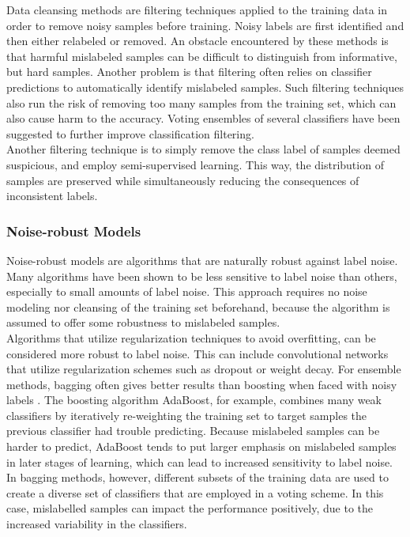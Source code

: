 Data cleansing methods are filtering techniques applied to the training data in order to remove noisy samples before training. Noisy labels are first identified and then either relabeled or removed. An obstacle encountered by these methods is that harmful mislabeled samples can be difficult to distinguish from informative, but hard samples. Another problem is that filtering often relies on classifier predictions to automatically identify mislabeled samples. Such filtering techniques also run the risk of removing too many samples from the training set, which can also cause harm to the accuracy. Voting ensembles of several classifiers have been suggested to further improve classification filtering.\\ 

Another filtering technique is to simply remove the class label of samples deemed suspicious, and employ semi-supervised learning. This way, the distribution of samples are preserved while simultaneously reducing the consequences of inconsistent labels.\\


\subsubsection{Noise-robust Models}
Noise-robust models are algorithms that are naturally robust against label noise. Many algorithms have been shown to be less sensitive to label noise than others, especially to small amounts of label noise. This approach requires no noise modeling nor cleansing of the training set beforehand, because the algorithm is assumed to offer some robustness to mislabeled samples.\\

 Algorithms that utilize regularization techniques to avoid overfitting, can be considered more robust to label noise. This can include convolutional networks that utilize regularization schemes such as dropout or weight decay. For ensemble methods, bagging often gives better results than boosting when faced with noisy labels \citep{Dietterich_boosting_bagging}. The boosting algorithm AdaBoost, for example, combines many weak classifiers by iteratively re-weighting the training set to target samples the previous classifier had trouble predicting. Because mislabeled samples can be harder to predict, AdaBoost tends to put larger emphasis on mislabeled samples in later stages of learning, which can lead to increased sensitivity to label noise. In bagging methods, however, different subsets of the training data are used to create a diverse set of classifiers that are employed in a voting scheme. In this case, mislabelled samples can impact the performance positively, due to the increased variability in the classifiers.   


